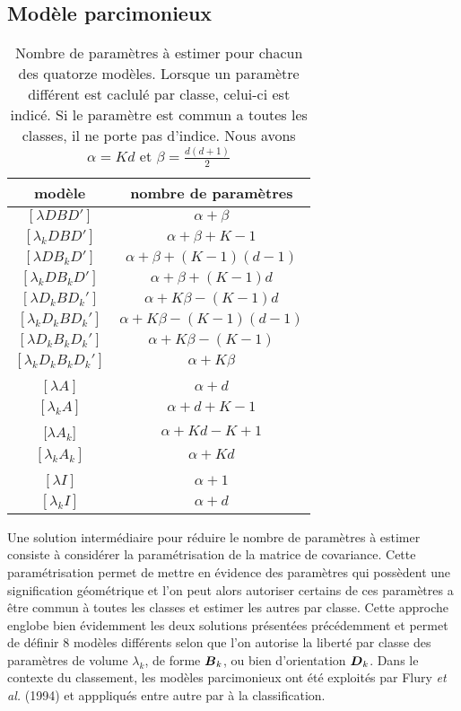  

\subsection{Mod\`ele parcimonieux}

\begin{table}\label{tab:modeles}
\begin{center}
\begin{tabular}{|c|c|}
\hline
mod\`ele & nombre de param\`etres \\
\hline
$[\lambda D B D']$&$\alpha+\beta$\\
$[\lambda_k D B D']$&$\alpha+\beta+K-1$\\
$[\lambda D B_k D']$&$\alpha+\beta+(K-1)(d-1)$\\
$[\lambda_k D B_k D']$&$\alpha+\beta+(K-1)d$\\
$[\lambda D_k B D_k']$&$\alpha+K\beta-(K-1)d$\\
$[\lambda_k D_k B D_k']$&$\alpha+K\beta-(K-1)(d-1)$\\
$[\lambda D_k B_k D_k']$&$\alpha+K\beta-(K-1)$\\
$[\lambda_k D_k B_k D_k']$&$\alpha+K\beta$\\
     & \\
$[\lambda A]$&$\alpha+d$\\
$[\lambda_k A]$  & $\alpha+d+K-1$\\
$[\lambda A_k$] &$\alpha+Kd-K+1$\\
$[\lambda_k A_k]$&$\alpha+Kd$\\
      &  \\
$[\lambda I]$&$\alpha+1$\\
$[\lambda_k I]$&$\alpha+d$\\
\hline
\end{tabular}
\end{center}
\caption{Nombre de param\`etres \`a estimer pour chacun des quatorze mod\`eles.
Lorsque un param\`etre diff\'erent est caclul\'e par classe, celui-ci est
indic\'e. Si le param\`etre est commun a toutes les classes, il ne porte
pas d'indice. Nous avons  $\alpha=Kd$ et  $\beta=\frac{d(d+1)}{2}$}
\end{table}

Une  solution interm\'ediaire  pour r\'eduire le nombre de param\`etres
\`a estimer consiste \`a consid\'erer la param\'etrisation
de la matrice de covariance. Cette param\'etrisation permet
de mettre en \'evidence des param\`etres qui poss\`edent une
signification g\'eom\'etrique et l'on peut alors autoriser
certains de ces param\`etres a \^etre commun \`a toutes les
classes et estimer les autres par classe. Cette approche
englobe bien \'evidemment les deux solutions pr\'esent\'ees
pr\'ec\'edemment et permet  de d\'efinir 8 mod\`eles
diff\'erents selon que l'on   autorise la libert\'e par classe 
des param\`etres de volume $\lambda_k$, de forme $\mbox{\boldmath $B$}_k$, ou
bien d'orientation $\mbox{\boldmath $D$}_k$. Dans le contexte du classement,
les mod\`eles parcimonieux ont \'et\'e exploit\'es par Flury {\em et al.}
(1994) et apppliqu\'es entre autre par  \`a la 
classification. 

